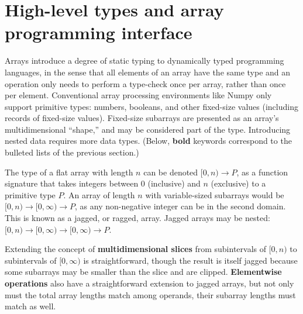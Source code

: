 \documentclass{webofc}
\begin{document}


\section{High-level types and array programming interface}

Arrays introduce a degree of static typing to dynamically typed programming languages, in the sense that all elements of an array have the same type and an operation only needs to perform a type-check once per array, rather than once per element. Conventional array processing environments like Numpy only support primitive types: numbers, booleans, and other fixed-size values (including records of fixed-size values). Fixed-size subarrays are presented as an array's multidimensional ``shape,'' and may be considered part of the type. Introducing nested data requires more data types. (Below, {\bf bold} keywords correspond to the bulleted lists of the previous section.)

The type of a flat array with length $n$ can be denoted $[0, n) \to P$, as a function signature that takes integers between $0$ (inclusive) and $n$ (exclusive) to a primitive type $P$. An array of length $n$ with variable-sized subarrays would be $[0, n) \to [0, \infty) \to P$, as any non-negative integer can be in the second domain. This is known as a jagged, or ragged, array. Jagged arrays may be nested: $[0, n) \to [0, \infty) \to [0, \infty) \to P$.

Extending the concept of {\bf multidimensional slices} from subintervals of $[0, n)$ to subintervals of $[0, \infty)$ is straightforward, though the result is itself jagged because some subarrays may be smaller than the slice and are clipped. {\bf Elementwise operations} also have a straightforward extension to jagged arrays, but not only must the total array lengths match among operands, their subarray lengths must match as well.
\end{document}
